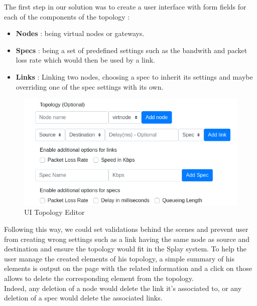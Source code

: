 \documentclass{eplmastersthesis}
\begin{document}
          The first step in our solution was to create a user interface with
          form fields for each of the components of the topology :

          \begin{itemize}
            \item \textbf{Nodes} : being virtual nodes or gateways.
            \item \textbf{Specs} : being a set of predefined settings such as the
            bandwith and packet loss rate which would then be used by
            a link.
            \item \textbf{Links} : Linking two nodes, choosing a spec to
            inherit its settings and maybe overriding one of the spec settings
            with its own.
          \end{itemize}

          \begin{figure}[H]
            \centering
            \includegraphics[scale=0.6]{figures/editor_topology.png}
            \caption{\label{editor_topology} UI Topology Editor}
          \end{figure}

          Following this way, we could set validations behind the scenes and
          prevent user from creating wrong settings such as a link having the
          same node as source and destination and ensure the topology would
          fit in the Splay system. To help the user manage the created
          elements of his topology, a simple summary of his elements is
          output on the page with the related information and a click on those
          allows to delete the corresponding element from the topology.\\
          Indeed, any deletion of a node would delete the link it's associated
          to, or any deletion of a spec would delete the associated links.\\
\end{document}
